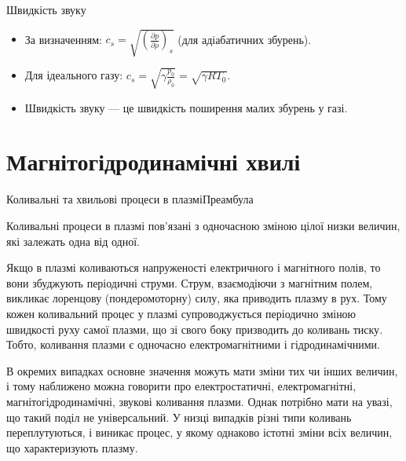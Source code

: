 \documentclass[]{beamer}
\begin{document}
\begin{frame}{Швидкість звуку}
	\begin{itemize}
		\item За визначенням: $c_s = \sqrt{\left(\frac{\partial p}{\partial \rho}\right)_s}$ (для адіабатичних збурень).
		\item Для ідеального газу: $c_s = \sqrt{\gamma \frac{p_0}{\rho_0}} = \sqrt{\gamma R T_0}$.
		\item Швидкість звуку — це швидкість поширення малих збурень у газі.
	\end{itemize}
\end{frame}

\section{Магнітогідродинамічні хвилі}

\begin{frame}{Коливальні та хвильові процеси в плазмі}{Преамбула}
	\begin{block}{}\justifying\footnotesize
		Коливальні процеси в плазмі пов'язані з одночасною зміною цілої низки величин, які залежать одна від одної.

		\medskip

		Якщо в плазмі \alert{коливаються напруженості електричного} і \alert{магнітного полів}, то вони збуджують \alert{періодичні струми}. Струм, взаємодіючи з магнітним полем, викликає лоренцову (пондеромоторну) силу, яка приводить плазму в рух. Тому кожен коливальний процес у плазмі супроводжується \alert{періодично зміною швидкості руху самої плазми}, що зі свого боку призводить до \alert{коливань тиску}. Тобто, \alert{коливання плазми є одночасно електромагнітними і гідродинамічними}.

		\medskip

		В окремих випадках основне значення можуть мати зміни тих чи інших величин, і тому наближено можна говорити про \alert{електростатичні}, \alert{електромагнітні}, \alert{магнітогідродинамічні}, \alert{звукові} коливання плазми. Однак потрібно мати на увазі, що такий поділ не універсальний. У низці випадків різні типи коливань переплутуються, і виникає процес, у якому однаково істотні зміни всіх величин, що характеризують плазму.

	\end{block}
\end{frame}
\end{document}
